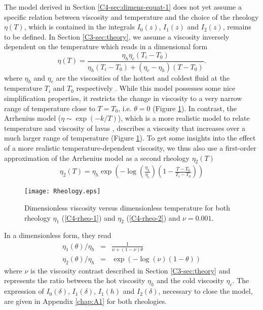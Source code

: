 The model derived in  Section \ref{C4-sec:dimens-equat-1} does not yet
assume a specific  relation between viscosity and  temperature and the
choice of the rheology $\eta(T)$,  which is contained in the integrals
$I_0(z)$, $I_1(z)$  and $I_2(z)$, remains  to be defined.   In Section
\ref{C3-sec:theory}, we assume a  viscosity inversely dependent on the
temperature which reads in a dimensional form
\begin{equation}
  \eta(T)=\frac{\eta_h
    \eta_c(T_i-T_0)}{\eta_h(T_i-T_0)+(\eta_c-\eta_h)(T-T_0)}.
\end{equation}
where $\eta_h$  and $\eta_c$  are the viscosities  of the  hottest and
coldest  fluid  at  the   temperature  $T_i$  and  $T_0$  respectively
\citep{Bercovici:2007vc}.   While  this   model  possesses  some  nice
simplification properties, it  restricts the change in  viscosity to a
very narrow  range of  temperature close  to $T=T_0$,  i.e. $\theta=0$
(Figure   \ref{C4-Rheology}).   In   contrast,  the   Arrhenius  model
($\eta \sim  \exp(-k/T)$), which is  a more realistic model  to relate
temperature and viscosity of lavas \citep{Blatt:2ViMWPc0}, describes a
viscosity  that increases  over  a much  larger  range of  temperature
(Figure \ref{C4-Rheology}).  To get some insights into the effect of a
more  realistic temperature-dependent  viscosity, we  thus also  use a
first-order approximation of the Arrhenius  model as a second rheology
$\eta_2(T)$ \citep{Diniega:2013eh}
\begin{eqnarray}
  \eta_2(T)                          =                          \eta_h
  \exp\left(-\log\left(\frac{\eta_h}{\eta_c}\right)\left(1-\frac{T-T_0}{T_i-T_0}\right)\right)
\end{eqnarray}
\begin{figure}[htbp]
  \begin{center}
    \graphicspath{ {/Users/thorey/Documents/These/Projet/Refroidissement/Skin_Model/Figure/Figure_Heating/} }
    \texttt{[image: Rheology.eps]}
    \caption{Dimensionless viscosity  versus dimensionless temperature
      for  both  rheology   $\eta_1$  (\ref{C4-rheo-1})  and  $\eta_2$
      (\ref{C4-rheo-2}) and $\nu=0.001$.}
    \label{C4-Rheology}
  \end{center}
\end{figure}
In a dimensionless form, they read
\begin{eqnarray}
  \eta_1(\theta)/\eta_h&=&\frac{1}{\nu+(1-\nu)\theta} \label{C4-rheo-1}\\
  \eta_2(\theta)/\eta_h&=&\exp\left(-\log(\nu)\left(1-\theta\right)\right)  \label{C4-rheo-2}
\end{eqnarray}
where   $\nu$  is   the  viscosity   contrast  described   in  Section
\ref{C3-sec:theory} and represents the ratio between the hot viscosity
$\eta_h$  and   the  cold  viscosity  $\eta_c$.    The  expression  of
$I_0(\delta)$, $I_1(\delta)$, $I_1(h)$ and $I_2(\delta)$, necessary to
close  the model,  are given  in Appendix  \ref{chap:A1} for
both rheologies.

